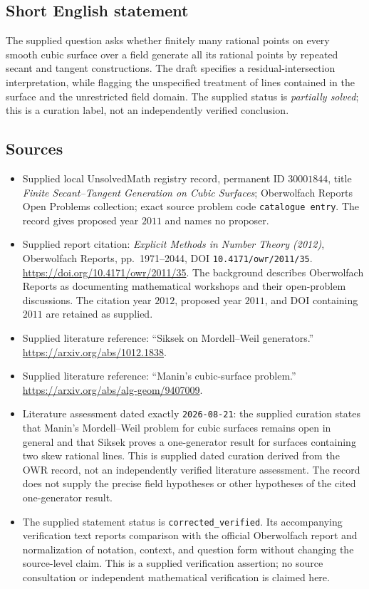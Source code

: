 \documentclass[11pt]{article}
\begin{document}
\subsection{Short English statement}
The supplied question asks whether finitely many rational points on every smooth cubic surface over a field generate all its rational points by repeated secant and tangent constructions. The draft specifies a residual-intersection interpretation, while flagging the unspecified treatment of lines contained in the surface and the unrestricted field domain. The supplied status is \emph{partially solved}; this is a curation label, not an independently verified conclusion.
\subsection{Sources}
\begin{itemize}
\item Supplied local UnsolvedMath registry record, permanent ID \(30001844\), title \emph{Finite Secant--Tangent Generation on Cubic Surfaces}; Oberwolfach Reports Open Problems collection; exact source problem code \texttt{catalogue entry}. The record gives proposed year \(2011\) and names no proposer.
\item Supplied report citation: \emph{Explicit Methods in Number Theory (2012)}, Oberwolfach Reports, pp.\ 1971--2044, DOI \texttt{10.4171/owr/2011/35}. \url{https://doi.org/10.4171/owr/2011/35}. The background describes Oberwolfach Reports as documenting mathematical workshops and their open-problem discussions. The citation year \(2012\), proposed year \(2011\), and DOI containing \(2011\) are retained as supplied.
\item Supplied literature reference: ``Siksek on Mordell--Weil generators.'' \url{https://arxiv.org/abs/1012.1838}.
\item Supplied literature reference: ``Manin's cubic-surface problem.'' \url{https://arxiv.org/abs/alg-geom/9407009}.
\item Literature assessment dated exactly \texttt{2026-08-21}: the supplied curation states that Manin's Mordell--Weil problem for cubic surfaces remains open in general and that Siksek proves a one-generator result for surfaces containing two skew rational lines. This is supplied dated curation derived from the OWR record, not an independently verified literature assessment. The record does not supply the precise field hypotheses or other hypotheses of the cited one-generator result.
\item The supplied statement status is \texttt{corrected\_verified}. Its accompanying verification text reports comparison with the official Oberwolfach report and normalization of notation, context, and question form without changing the source-level claim. This is a supplied verification assertion; no source consultation or independent mathematical verification is claimed here.
\end{itemize}
\end{document}
